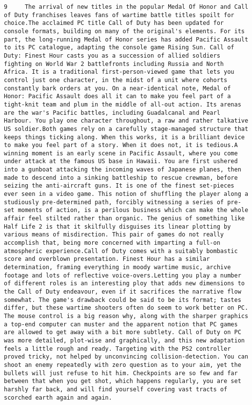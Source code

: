 \documentclass[11pt]{article}
\begin{document}
\begin{Verbatim}[commandchars=\\\{\}]
         9     The arrival of new titles in the popular Medal Of Honor and Call of Duty franchises leaves fans of wartime battle titles spoilt for choice.The acclaimed PC title Call of Duty has been updated for console formats, building on many of the original's elements. For its part, the long-running Medal of Honor series has added Pacific Assault to its PC catalogue, adapting the console game Rising Sun. Call of Duty: Finest Hour casts you as a succession of allied soldiers fighting on World War 2 battlefronts including Russia and North Africa. It is a traditional first-person-viewed game that lets you control just one character, in the midst of a unit where cohorts constantly bark orders at you. On a near-identical note, Medal of Honor: Pacific Assault does all it can to make you feel part of a tight-knit team and plum in the middle of all-out action. Its arenas are the war's Pacific battles, including Guadalcanal and Pearl Harbour. You play one character throughout, a raw and rather talkative US soldier.Both games rely on a carefully stage-managed structure that keeps things ticking along. When this works, it is a brilliant device to make you feel part of a story. When it does not, it is tedious.A winning moment is an early scene in Pacific Assault, where you come under attack at the famous US base in Hawaii. You are first ushered into a gunboat attacking the incoming waves of Japanese planes, then made to descend into a sinking battleship to rescue crewman, before seizing the anti-aircraft guns. It is one of the finest set-pieces ever seen in a video game. This notion of shuffling the player along a studiously pre-determined path, forcibly witnessing a series of pre-set moments of action, is a perilous business which can make the whole affair feel stilted rather than organic. The genius of something like Half Life 2 is that it skilfully disguises its linear plotting by various means of misdirection. This pair of games do not really accomplish that, being more concerned with imparting a full-on atmospheric experience.Call of Duty comes with a suitably bombastic score and overblown presentation. Finest Hour has a similar determination, framing everything in moody wartime music, archive footage and lots of reflective voice-overs.Letting you play a number of different roles is an interesting ploy that adds new dimensions to the Call of Duty endeavour, even if it sacrifices the narrative flow somewhat. The game's drawback could be said to be its format; tastes differ, but these wartime shooters often do seem to work better on PC. The mouse control is a big reason why, along with the sharper graphics a top-end computer can muster and the apparent notion that PC games are allowed to get away with a bit more subtlety. Call of Duty on PC was more detailed, plot-wise and graphically, and this new adaptation feels a little rough and ready. Targeting with the PS2 controller proved tricky, not helped by unconvincing collision-detection. You can shoot an enemy repeatedly with zero question as to your aim, yet the bullets will just refuse to hit him. Checkpoints are so few and far between that when you get shot, which happens regularly, you are set harshly far back, and will find yourself covering vast tracts of scorched earth again and again. 
\end{Verbatim}
\end{document}
